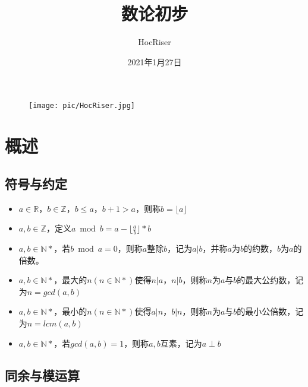 \documentclass{beamer}
\author{HocRiser}
\title{数论初步}
\institute{吉林大学 20级唐计}
\date{2021年1月27日}
\begin{document}
\kaishu
\begin{frame}
	\titlepage
	\begin{figure}[htpb]
		\begin{center}
			\texttt{[image: pic/HocRiser.jpg]}
		\end{center}
	\end{figure}
\end{frame}

\begin{frame}
	\tableofcontents[sectionstyle=show,subsectionstyle=show/shaded/hide,subsubsectionstyle=show/shaded/hide]
\end{frame}


\section{概述}

\subsection{符号与约定}

\begin{frame}
\begin{itemize}[<+-| alert@+>]
	\item $a \in \mathbb{R}$，$b \in \mathbb{Z}$，$b \leq a$，$b+1>a$，则称$b = \lfloor a \rfloor$
	\item $a,b \in \mathbb{Z}$，定义$a \bmod b=a-\lfloor\frac{a}{b}\rfloor*b$
	\item $a,b \in \mathbb{N*}$，若$b \bmod a = 0$，则称$a$整除$b$，记为$a|b$，并称$a$为$b$的约数，$b$为$a$的倍数。
	\item $a,b \in \mathbb{N*}$，最大的$n(n \in \mathbb{N*})$使得$n|a$，$n|b$，则称$n$为$a$与$b$的最大公约数，记为$n = gcd(a,b)$
	\item $a,b \in \mathbb{N*}$，最小的$n(n \in \mathbb{N*})$使得$a|n$，$b|n$，则称$n$为$a$与$b$的最小公倍数，记为$n = lcm(a,b)$
	\item $a,b \in \mathbb{N*}$，若$gcd(a,b)=1$，则称$a,b$互素，记为$a \perp b$
\end{itemize}
\end{frame}

\subsection{同余与模运算}
\end{document}
